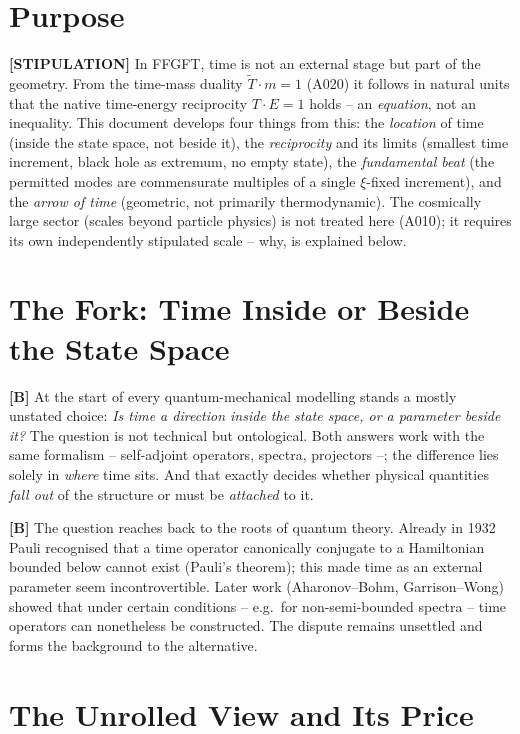 \section{Purpose}

\textbf{[STIPULATION]} In FFGFT, time is not an external stage but part of the
geometry. From the time-mass duality $\tilde T\cdot m = 1$ (A020) it follows in
natural units that the native time-energy reciprocity $T\cdot E = 1$ holds -- an
\emph{equation}, not an inequality. This document develops four things from this:
the \emph{location} of time (inside the state space, not beside it), the
\emph{reciprocity} and its limits (smallest time increment, black hole as
extremum, no empty state), the \emph{fundamental beat} (the permitted modes are
commensurate multiples of a single $\xi$-fixed increment), and the \emph{arrow of
time} (geometric, not primarily thermodynamic). The cosmically large sector
(scales beyond particle physics) is not treated here (A010); it requires its own
independently stipulated scale -- why, is explained below.

\section{The Fork: Time Inside or Beside the State Space}

\textbf{[B]} At the start of every quantum-mechanical modelling stands a mostly
unstated choice: \emph{Is time a direction inside the state space, or a parameter
beside it?} The question is not technical but ontological. Both answers work
with the same formalism -- self-adjoint operators, spectra, projectors --; the
difference lies solely in \emph{where} time sits. And that exactly decides
whether physical quantities \emph{fall out} of the structure or must be
\emph{attached} to it.

\textbf{[B]} The question reaches back to the roots of quantum theory. Already
in 1932 Pauli recognised that a time operator canonically conjugate to a
Hamiltonian bounded below cannot exist (Pauli's theorem); this made time as an
external parameter seem incontrovertible. Later work (Aharonov--Bohm,
Garrison--Wong) showed that under certain conditions -- e.g.\ for non-semi-bounded
spectra -- time operators can nonetheless be constructed. The dispute remains
unsettled and forms the background to the alternative.

\section{The Unrolled View and Its Price}

